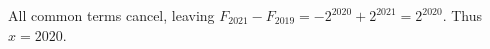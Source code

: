 All common terms cancel, leaving $F_{2021}-F_{2019}=-2^{2020}+2^{2021}=2^{2020}$. Thus $\boxed{x=2020}$.
